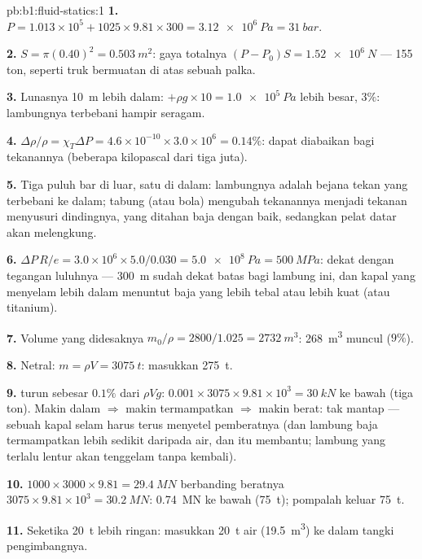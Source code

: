 \begin{solution}{pb:b1:fluid-statics:1}
\textbf{1.} $P = 1.013\times10^5 + 1025 \times 9.81 \times 300 = \qty{3.12e6}{Pa}
= \qty{31}{bar}$.

\textbf{2.} $S = \pi(0.40)^2 = \qty{0.503}{m^2}$: gaya totalnya $(P - P_0)S =
\qty{1.52e6}{N}$ --- 155 ton, seperti truk bermuatan di atas sebuah palka.

\textbf{3.} Lunasnya \qty{10}{m} lebih dalam: $+\rho g \times 10 = \qty{1.0e5}{Pa}$ lebih besar,
$3\%$: lambungnya terbebani hampir seragam.

\textbf{4.} $\Delta\rho/\rho = \chi_T\Delta P = 4.6\times10^{-10} \times 3.0\times10^6
= 0.14\%$: dapat diabaikan bagi tekanannya (beberapa kilopascal dari tiga
juta).

\textbf{5.} Tiga puluh bar di luar, satu di dalam: lambungnya adalah bejana
tekan yang terbebani ke dalam; tabung (atau bola) mengubah tekanannya menjadi
tekanan menyusuri dindingnya, yang ditahan baja dengan baik, sedangkan pelat
datar akan melengkung.

\textbf{6.} $\Delta P\,R/e = 3.0\times10^6 \times 5.0/0.030 = \qty{5.0e8}{Pa}
= \qty{500}{MPa}$: dekat dengan tegangan luluhnya --- \qty{300}{m} sudah dekat
batas bagi lambung ini, dan kapal yang menyelam lebih dalam menuntut baja yang lebih tebal atau lebih kuat
(atau titanium).

\textbf{7.} Volume yang didesaknya $m_0/\rho = 2800/1.025 = \qty{2732}{m^3}$: \qty{268}{m^3}
muncul ($9\%$).

\textbf{8.} Netral: $m = \rho V = \qty{3075}{t}$: masukkan \qty{275}{t}.

\textbf{9.}  turun sebesar $0.1\%$ dari $\rho Vg$: $0.001 \times 3075 \times 9.81
\times10^3 = \qty{30}{kN}$ ke bawah (tiga ton). Makin dalam $\Rightarrow$ makin
termampatkan $\Rightarrow$ makin berat: tak mantap --- sebuah kapal selam harus terus
menyetel pemberatnya (dan lambung baja termampatkan lebih sedikit daripada air, dan itu membantu;
lambung yang terlalu lentur akan tenggelam tanpa kembali).

\textbf{10.}  $1000 \times 3000 \times 9.81 = \qty{29.4}{MN}$ berbanding
beratnya $3075 \times 9.81 \times 10^3 = \qty{30.2}{MN}$: \qty{0.74}{MN} ke bawah
(\qty{75}{t}); pompalah keluar \qty{75}{t}.

\textbf{11.} Seketika \qty{20}{t} lebih ringan: masukkan \qty{20}{t} air
(\qty{19.5}{m^3}) ke dalam tangki pengimbangnya.


\end{solution}
